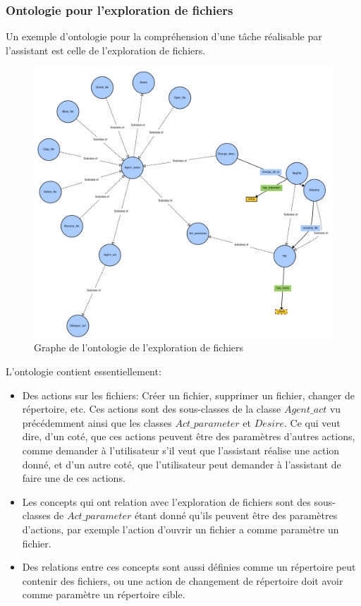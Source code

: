 \subsubsection*{Ontologie pour l'exploration de fichiers}
Un exemple d'ontologie pour la compréhension d'une tâche réalisable par l'assistant est celle de l'exploration de fichiers.
\begin{figure}[H] 
	
	\centering
	\includegraphics[width=0.95\linewidth]{images/Conception/DM/onto_browser.png}
	\caption{Graphe de l'ontologie de l'exploration de fichiers}
\end{figure}\label{onto_browser}
L'ontologie contient essentiellement:
\begin{itemize}
	\item Des actions sur les fichiers: Créer un fichier, supprimer un fichier, changer de répertoire, etc. Ces actions sont des sous-classes de la classe  $Agent\_act$ vu précédemment ainsi que les classes $Act\_parameter$ et $Desire$. Ce qui veut dire, d'un coté, que ces actions peuvent être des paramètres d'autres actions, comme demander à l'utilisateur s'il veut que l'assistant réalise une action donné, et d'un autre coté, que l'utilisateur peut demander à l'assistant de faire une de ces actions. 
	\item Les concepts qui ont relation avec l'exploration de fichiers sont des sous-classes de $Act\_parameter$ étant donné qu'ils peuvent  être des paramètres d'actions, par exemple l'action d'ouvrir un fichier a comme paramètre un fichier.
	\item Des relations entre ces concepts sont aussi définies comme un répertoire peut contenir des fichiers, ou une action de changement de répertoire doit avoir comme paramètre un répertoire cible.
\end{itemize}
